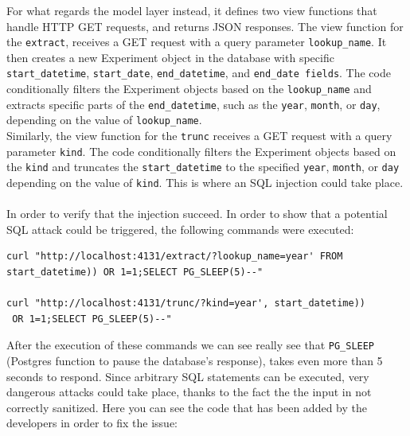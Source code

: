 \documentclass{article}
\begin{document}
	For what regards the model layer instead, it defines two view functions that handle HTTP GET requests, and returns JSON responses. The view function for the \verb|extract|, receives a GET request with a query parameter \verb|lookup_name|. It then creates a new Experiment object in the database with specific \verb|start_datetime|, \verb|start_date|, \verb|end_datetime|, and \verb|end_date fields|. The code conditionally filters the Experiment objects based on the \verb|lookup_name| and extracts specific parts of the \verb|end_datetime|, such as the \verb|year|, \verb|month|, or \verb|day|, depending on the value of \verb|lookup_name|. \\ 
	Similarly, the view function for the \verb|trunc| receives a GET request with a query parameter \verb|kind|. The code conditionally filters the Experiment objects based on the \verb|kind| and truncates the \verb|start_datetime| to the specified \verb|year|, \verb|month|, or \verb|day| depending on the value of \verb|kind|. This is where an SQL injection could take place. \\ \\
	In order to verify that the injection succeed. In order to show that a potential SQL attack could be triggered, the following commands were executed:
	\begin{lstlisting}[style=Bashstyle]
curl "http://localhost:4131/extract/?lookup_name=year' FROM 
start_datetime)) OR 1=1;SELECT PG_SLEEP(5)--" 

curl "http://localhost:4131/trunc/?kind=year', start_datetime))
 OR 1=1;SELECT PG_SLEEP(5)--"
	\end{lstlisting}
	After the execution of these commands we can see really see that \verb|PG_SLEEP| (Postgres function to pause the database's response), takes even more than 5 seconds to respond. Since arbitrary SQL statements can be executed, very dangerous attacks could take place, thanks to the fact the the input in not correctly sanitized.
	Here you can see the code that has been added by the developers in order to fix the issue:
	
\end{document}
